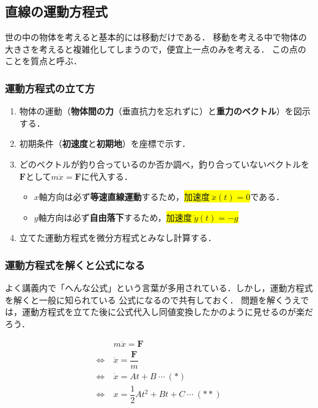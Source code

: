 \documentclass[a4paper,11pt]{ltjsarticle}
\begin{document}
\subsection{直線の運動方程式}

世の中の物体を考えると基本的には移動だけである．
移動を考える中で物体の大きさを考えると複雑化してしまうので，便宜上一点のみを考える．
この点のことを質点と呼ぶ．

\subsubsection{運動方程式の立て方}

\begin{enumerate}
  \item 物体の運動（\textbf{物体間の力}（垂直抗力を忘れずに）と\textbf{重力のベクトル}）を図示する．
  \item 初期条件（\textbf{初速度}と\textbf{初期地}）を座標で示す．
  \item どのベクトルが釣り合っているのか否か調べ，釣り合っていないベクトルを$\bm{F}$として$m\ddot{x}=\bm{F}$に代入する．
  \begin{itemize}
    \item $x$軸方向は必ず\textbf{等速直線運動}するため，\colorbox{yellow}{$加速度\ \ddot{x}(t) = 0$}である．
    \item $y$軸方向は必ず\textbf{自由落下}するため，\colorbox{yellow}{$加速度\ \ddot{y}(t) = -g$}
  \end{itemize}
  \item 立てた運動方程式を微分方程式とみなし計算する．
\end{enumerate}

\clearpage

\subsubsection{運動方程式を解くと公式になる}

よく講義内で「へんな公式」という言葉が多用されている．しかし，運動方程式を解くと一般に知られている
公式になるので共有しておく．
問題を解くうえでは，運動方程式を立てた後に公式代入し同値変換したかのように見せるのが楽だろう．

\begin{equation}
  \renewcommand{\arraystretch}{2}
  \begin{array}{rl}
    &\ m \ddot{x} = \bm{F}
    \\
    \Leftrightarrow
    &\ \ddot{x} = \dfrac{\bm{F}}{m}
    \\
    \Leftrightarrow
    &\ \dot{x} = At + B\ \cdots\ (\ast)
    \\
    \Leftrightarrow
    &\ x = \dfrac{1}{2}At^{2} + Bt + C\ \cdots\ (\ast \ast)
  \end{array}
\end{equation}
\end{document}
